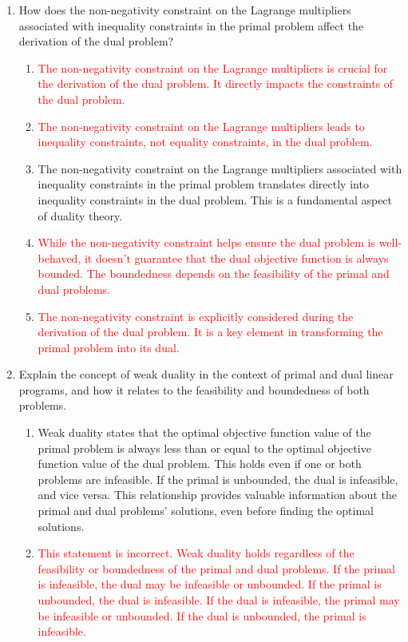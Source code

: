 \documentclass{article}%
\newcommand{\incorrect}[1]{\textcolor{red}{#1}}
\begin{document}
\begin{enumerate}
\begin{enumerate}
\end{enumerate}%
\vspace{1em}%
\item How does the non-negativity constraint on the Lagrange multipliers associated with inequality constraints in the primal problem affect the derivation of the dual problem?%
\begin{enumerate}%
\item \incorrect{The non-negativity constraint on the Lagrange multipliers is crucial for the derivation of the dual problem. It directly impacts the constraints of the dual problem.}%
\item \incorrect{The non-negativity constraint on the Lagrange multipliers leads to inequality constraints, not equality constraints, in the dual problem.}%
\item The non-negativity constraint on the Lagrange multipliers associated with inequality constraints in the primal problem translates directly into inequality constraints in the dual problem. This is a fundamental aspect of duality theory.%
\item \incorrect{While the non-negativity constraint helps ensure the dual problem is well-behaved, it doesn't guarantee that the dual objective function is always bounded. The boundedness depends on the feasibility of the primal and dual problems.}%
\item \incorrect{The non-negativity constraint is explicitly considered during the derivation of the dual problem. It is a key element in transforming the primal problem into its dual.}%
\end{enumerate}%
\vspace{1em}%
\item Explain the concept of weak duality in the context of primal and dual linear programs, and how it relates to the feasibility and boundedness of both problems.%
\begin{enumerate}%
\item Weak duality states that the optimal objective function value of the primal problem is always less than or equal to the optimal objective function value of the dual problem. This holds even if one or both problems are infeasible.  If the primal is unbounded, the dual is infeasible, and vice versa. This relationship provides valuable information about the primal and dual problems' solutions, even before finding the optimal solutions.%
\item \incorrect{This statement is incorrect. Weak duality holds regardless of the feasibility or boundedness of the primal and dual problems.  If the primal is infeasible, the dual may be infeasible or unbounded. If the primal is unbounded, the dual is infeasible.  If the dual is infeasible, the primal may be infeasible or unbounded. If the dual is unbounded, the primal is infeasible.}%

\end{enumerate}
\end{enumerate}
\end{document}
